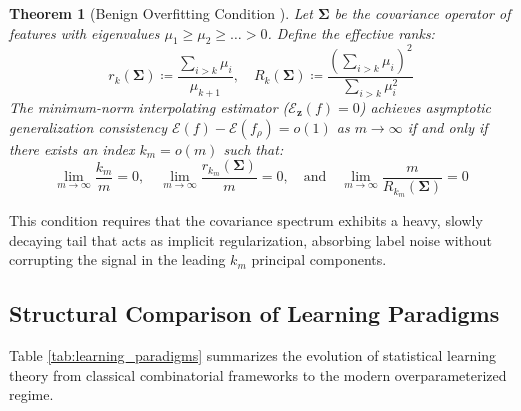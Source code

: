 \documentclass[11pt,a4paper]{article}
\newtheorem{theorem}{Theorem}[section]
\theoremstyle{definition}
\begin{document}
\begin{theorem}[Benign Overfitting Condition \cite{bartlett2020}]\label{thm:benign_overfitting}
Let $\mathbf{\Sigma}$ be the covariance operator of features with eigenvalues $\mu_1 \ge \mu_2 \ge \dots > 0$.
Define the effective ranks:
\begin{equation}\label{eq:effective_ranks}
r_k(\mathbf{\Sigma}) \coloneqq \frac{\sum_{i > k} \mu_i}{\mu_{k+1}}, \quad R_k(\mathbf{\Sigma}) \coloneqq \frac{(\sum_{i > k} \mu_i)^2}{\sum_{i > k} \mu_i^2}
\end{equation}
The minimum-norm interpolating estimator ($\mathcal{E}_{\mathbf{z}}(f) = 0$) achieves asymptotic generalization consistency $\mathcal{E}(f) - \mathcal{E}(f_\rho) = o(1)$ as $m \to \infty$ if and only if there exists an index $k_m = o(m)$ such that:
\begin{equation}\label{eq:benign_condition}
\lim_{m \to \infty} \frac{k_m}{m} = 0, \quad \lim_{m \to \infty} \frac{r_{k_m}(\mathbf{\Sigma})}{m} = 0, \quad \text{and} \quad \lim_{m \to \infty} \frac{m}{R_{k_m}(\mathbf{\Sigma})} = 0
\end{equation}
\end{theorem}
This condition requires that the covariance spectrum exhibits a heavy, slowly decaying tail that acts as implicit regularization, absorbing label noise without corrupting the signal in the leading $k_m$ principal components.

\subsection{Structural Comparison of Learning Paradigms}

Table \ref{tab:learning_paradigms} summarizes the evolution of statistical learning theory from classical combinatorial frameworks to the modern overparameterized regime.
\end{document}
